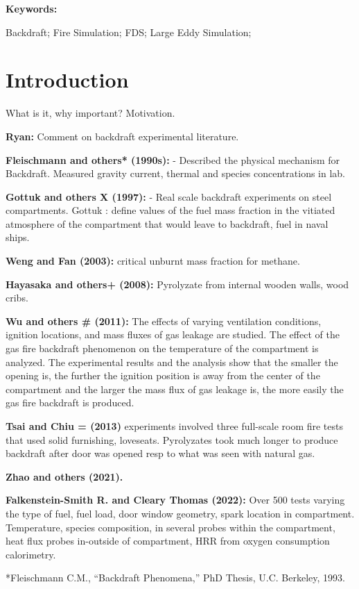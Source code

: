 \documentclass[12pt,letterpaper]{article}
\begin{document}
\begin{flushleft}
\textbf{Keywords:}

Backdraft; Fire Simulation; FDS; Large Eddy Simulation; 

\section{Introduction}

 What is it, why important? Motivation.

\textbf{Ryan:} Comment on backdraft experimental literature.

\textbf{Fleischmann and others* (1990s):}
	- Described the physical mechanism for Backdraft. Measured gravity current, thermal and species concentrations in lab.

\textbf{Gottuk and others X (1997):}
- Real scale backdraft experiments on steel compartments. Gottuk : define values of the fuel mass fraction in the vitiated atmosphere of the compartment that would leave to backdraft, fuel in naval ships.

\textbf{Weng and Fan (2003):} critical unburnt mass fraction for methane.

\textbf{Hayasaka and others+ (2008):} Pyrolyzate from internal wooden walls, wood cribs.

\textbf{Wu and others # (2011):} The effects of varying ventilation conditions, ignition locations, and mass fluxes of gas leakage are studied. The effect of the gas fire backdraft phenomenon on the temperature of the compartment is analyzed. The experimental results and the analysis show that the smaller the opening is, the further the ignition position is away from the center of the compartment and the larger the mass flux of gas leakage is, the more easily the gas fire backdraft is produced. 


\textbf{Tsai and Chiu = (2013)} experiments involved three full-scale room fire tests that used solid furnishing, loveseats. Pyrolyzates took much longer to produce backdraft after door was opened resp to what was seen with natural gas.

\textbf{Zhao and others (2021).}


\textbf{Falkenstein-Smith R. and Cleary Thomas (2022):} Over 500 tests varying the type of fuel, fuel load, door window geometry, spark location in compartment. Temperature, species composition, in several probes within the compartment, heat flux probes in-outside of compartment, HRR from oxygen consumption calorimetry.


*Fleischmann C.M., “Backdraft Phenomena,” PhD Thesis, U.C. Berkeley, 1993.


\end{flushleft}
\end{document}
